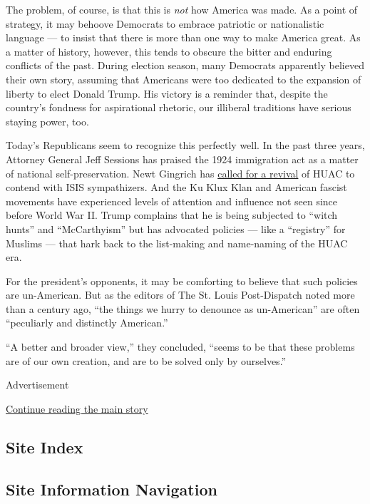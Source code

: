 The problem, of course, is that this is \emph{not} how America was made.
As a point of strategy, it may behoove Democrats to embrace patriotic or
nationalistic language --- to insist that there is more than one way to
make America great. As a matter of history, however, this tends to
obscure the bitter and enduring conflicts of the past. During election
season, many Democrats apparently believed their own story, assuming
that Americans were too dedicated to the expansion of liberty to elect
Donald Trump. His victory is a reminder that, despite the country's
fondness for aspirational rhetoric, our illiberal traditions have
serious staying power, too.

Today's Republicans seem to recognize this perfectly well. In the past
three years, Attorney General Jeff Sessions has praised the 1924
immigration act as a matter of national self-preservation. Newt Gingrich
has
\href{http://www.cnn.com/2016/06/14/politics/newt-gingrich-house-un-american-activities-committee/}{called
for a revival} of HUAC to contend with ISIS sympathizers. And the Ku
Klux Klan and American fascist movements have experienced levels of
attention and influence not seen since before World War II. Trump
complains that he is being subjected to ``witch hunts'' and
``McCarthyism'' but has advocated policies --- like a ``registry'' for
Muslims --- that hark back to the list-making and name-naming of the
HUAC era.

For the president's opponents, it may be comforting to believe that such
policies are un-American. But as the editors of The St. Louis
Post-Dispatch noted more than a century ago, ``the things we hurry to
denounce as un-American'' are often ``peculiarly and distinctly
American.''

``A better and broader view,'' they concluded, ``seems to be that these
problems are of our own creation, and are to be solved only by
ourselves.''

Advertisement

\protect\hyperlink{after-bottom}{Continue reading the main story}

\hypertarget{site-index}{%
\subsection{Site Index}\label{site-index}}

\hypertarget{site-information-navigation}{%
\subsection{Site Information
Navigation}\label{site-information-navigation}}

